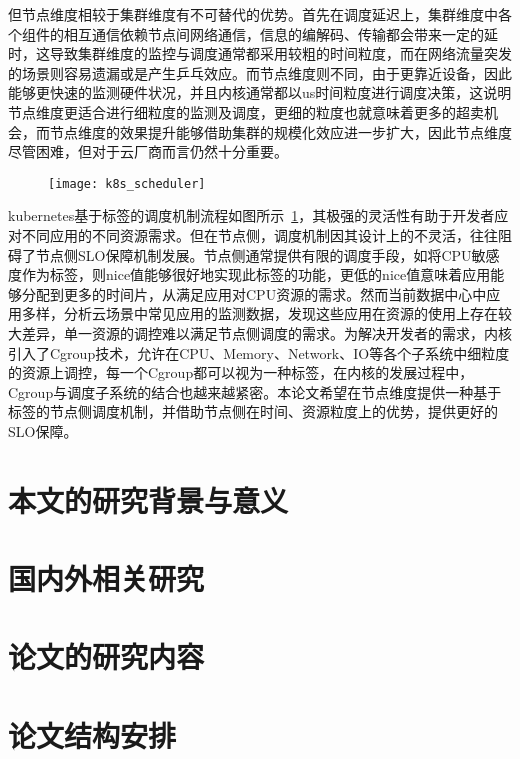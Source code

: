 但节点维度相较于集群维度有不可替代的优势。首先在调度延迟上，集群维度中各个组件的相互通信依赖节点间网络通信，信息的编解码、传输都会带来一定的延时，这导致集群维度的监控与调度通常都采用较粗的时间粒度，而在网络流量突发的场景则容易遗漏或是产生乒乓效应。而节点维度则不同，由于更靠近设备，因此能够更快速的监测硬件状况，并且内核通常都以us时间粒度进行调度决策，这说明节点维度更适合进行细粒度的监测及调度，更细的粒度也就意味着更多的超卖机会，而节点维度的效果提升能够借助集群的规模化效应进一步扩大，因此节点维度尽管困难，但对于云厂商而言仍然十分重要。

\begin{figure}[!htbp]
    \centering
    \texttt{[image: k8s\_scheduler]}
    \label{fig:k8s_scheduler}
\end{figure}

kubernetes基于标签的调度机制流程如图所示~\ref{fig:k8s_scheduler}，其极强的灵活性有助于开发者应对不同应用的不同资源需求。但在节点侧，调度机制因其设计上的不灵活，往往阻碍了节点侧SLO保障机制发展。节点侧通常提供有限的调度手段，如将CPU敏感度作为标签，则nice值能够很好地实现此标签的功能，更低的nice值意味着应用能够分配到更多的时间片，从满足应用对CPU资源的需求。然而当前数据中心中应用多样，分析云场景中常见应用的监测数据，发现这些应用在资源的使用上存在较大差异，单一资源的调控难以满足节点侧调度的需求。为解决开发者的需求，内核引入了Cgroup技术，允许在CPU、Memory、Network、IO等各个子系统中细粒度的资源上调控，每一个Cgroup都可以视为一种标签，在内核的发展过程中，Cgroup与调度子系统的结合也越来越紧密。本论文希望在节点维度提供一种基于标签的节点侧调度机制，并借助节点侧在时间、资源粒度上的优势，提供更好的SLO保障。

\section{本文的研究背景与意义}

\section{国内外相关研究}

\section{论文的研究内容}

\section{论文结构安排}
